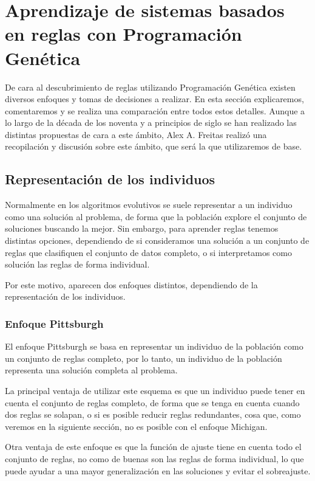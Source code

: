 \section{Aprendizaje de sistemas basados en reglas con Programación Genética}

De cara al descubrimiento de reglas utilizando Programación Genética existen diversos enfoques y tomas de decisiones a realizar. En esta sección explicaremos, comentaremos y se realiza una comparación entre todos estos detalles. Aunque a lo largo de la década de los noventa y a principios de siglo se han realizado las distintas propuestas de cara a este ámbito, Alex A. Freitas \cite{dataMiningDescubrimientoReglasGeneticos} realizó una recopilación y discusión sobre este ámbito, que será la que utilizaremos de base.


\subsection{Representación de los individuos}

Normalmente en los algoritmos evolutivos se suele representar a un individuo como una solución al problema, de forma que la población explore el conjunto de soluciones buscando la mejor. Sin embargo, para aprender reglas tenemos distintas opciones, dependiendo de si consideramos una solución a un conjunto de reglas que clasifiquen el conjunto de datos completo, o si interpretamos como solución las reglas de forma individual.

Por este motivo, aparecen dos enfoques distintos, dependiendo de la representación de los individuos.

\subsubsection{Enfoque Pittsburgh}

El enfoque Pittsburgh se basa en representar un individuo de la población como un conjunto de reglas completo, por lo tanto, un individuo de la población representa una solución completa al problema.

La principal ventaja de utilizar este esquema es que un individuo puede tener en cuenta el conjunto de reglas completo, de forma que se tenga en cuenta cuando dos reglas se solapan, o si es posible reducir reglas redundantes, cosa que, como veremos en la siguiente sección, no es posible con el enfoque Michigan.

Otra ventaja de este enfoque es que la función de ajuste tiene en cuenta todo el conjunto de reglas, no como de buenas son las reglas de forma individual, lo que puede ayudar a una mayor generalización en las soluciones y evitar el sobreajuste.

